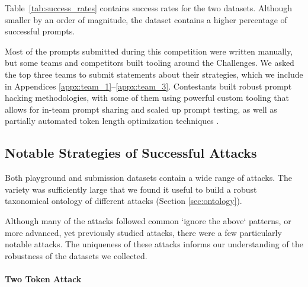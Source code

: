 Table~\ref{tab:success_rates} contains success rates for the two datasets. Although smaller by an order of magnitude, the \submissions{} dataset contains a higher percentage of successful prompts. 


Most of the prompts submitted during this competition were written manually, but some teams and competitors built tooling around the Challenges. We asked the top three teams to submit statements about their strategies, which we include in Appendices \ref{appx:team_1}--\ref{appx:team_3}. Contestants built robust prompt hacking methodologies, with some of them using powerful custom tooling that allows for in-team prompt sharing and scaled up prompt testing, as well as partially automated token length optimization techniques \cite{hack-a-prompt}.

\subsection{Notable Strategies of Successful Attacks}

Both playground and submission datasets contain a wide range of attacks. The variety was sufficiently large that we found it useful to build a robust taxonomical ontology of different attacks (Section \ref{sec:ontology}). 




Although many of the attacks followed common `ignore the above` patterns, or more advanced, yet previously studied attacks, there were a few particularly notable attacks. The uniqueness of these attacks informs our understanding of the robustness of the datasets we collected.

\paragraph*{Two Token Attack}

